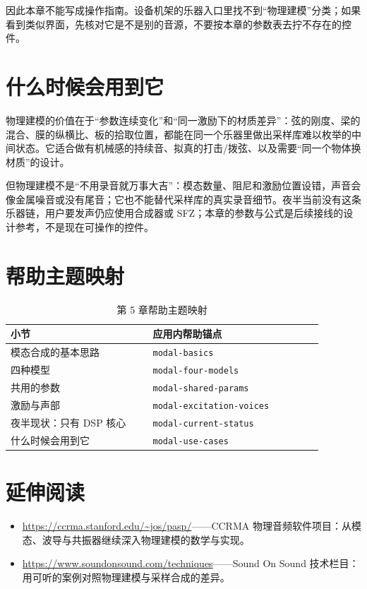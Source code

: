 因此本章不能写成操作指南。设备机架的乐器入口里找不到“物理建模”分类；如果看到类似界面，先核对它是不是别的音源，不要按本章的参数表去拧不存在的控件。


\section{什么时候会用到它}

物理建模的价值在于“参数连续变化”和“同一激励下的材质差异”：弦的刚度、梁的混合、膜的纵横比、板的拾取位置，都能在同一个乐器里做出采样库难以枚举的中间状态。它适合做有机械感的持续音、拟真的打击/拨弦、以及需要“同一个物体换材质”的设计。

但物理建模不是“不用录音就万事大吉”：模态数量、阻尼和激励位置设错，声音会像金属噪音或没有尾音；它也不能替代采样库的真实录音细节。夜半当前没有这条乐器链，用户要发声仍应使用合成器或 SFZ；本章的参数与公式是后续接线的设计参考，不是现在可操作的控件。

\section{帮助主题映射}

\begin{table}[htbp]
\centering
\small
\begin{tabular}{@{}p{0.40\linewidth}p{0.48\linewidth}@{}}
\hline
小节 & 应用内帮助锚点 \\
\hline
模态合成的基本思路 & \texttt{modal-basics} \\
四种模型 & \texttt{modal-four-models} \\
共用的参数 & \texttt{modal-shared-params} \\
激励与声部 & \texttt{modal-excitation-voices} \\
夜半现状：只有 DSP 核心 & \texttt{modal-current-status} \\
什么时候会用到它 & \texttt{modal-use-cases} \\
\hline
\end{tabular}
\caption{第 5 章帮助主题映射}
\end{table}

\section*{延伸阅读}
\begin{itemize}[leftmargin=1.5em]
\item \url{https://ccrma.stanford.edu/~jos/pasp/}——CCRMA 物理音频软件项目：从模态、波导与共振器继续深入物理建模的数学与实现。
\item \url{https://www.soundonsound.com/techniques}——Sound On Sound 技术栏目：用可听的案例对照物理建模与采样合成的差异。
\end{itemize}
